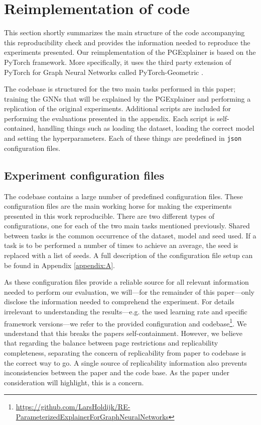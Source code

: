 \section{Reimplementation of code}\label{sec:3}
This section shortly summarizes the main structure of the code accompanying this reproducibility check and provides the information needed to reproduce the experiments presented. Our reimplementation of the PGExplainer is based on the PyTorch \cite{PyTorch} framework. More specifically, it uses the third party extension of PyTorch for Graph Neural Networks called PyTorch-Geometric \cite{PyTorch-Geometric}. 

The codebase is structured for the two main tasks performed in this paper; training the GNNs that will be explained by the PGExplainer and performing a replication of the original experiments. Additional scripts are included for performing the evaluations presented in the appendix. Each script is self-contained, handling things such as loading the dataset, loading the correct model and setting the hyperparameters. Each of these things are predefined in \texttt{json} configuration files. 

\subsection{Experiment configuration files}
The codebase contains a large number of predefined configuration files. These configuration files are the main working horse for making the experiments presented in this work reproducible. There are two different types of configurations, one for each of the two main tasks mentioned previously. Shared between tasks is the common occurrence of the dataset, model and seed used. If a task is to be performed a number of times to achieve an average, the seed is replaced with a list of seeds. A full description of the configuration file setup can be found in Appendix \ref{appendix:A}. 

As these configuration files provide a reliable source for all relevant information needed to perform our evaluation, we will---for the remainder of this paper---only disclose the information needed to comprehend the experiment. For details irrelevant to understanding the results---e.g. the used learning rate and specific framework versions---we refer to the provided configuration and codebase\footnote{\url{https://github.com/LarsHoldijk/RE-ParameterizedExplainerForGraphNeuralNetworks}}. We understand that this breaks the papers self-containment. However, we believe that regarding the balance between page restrictions and replicability completeness, separating the concern of replicability from paper to codebase is the correct way to go. A single source of replicability information also prevents inconsistencies between the paper and the code base. As the paper under consideration will highlight, this is a concern.